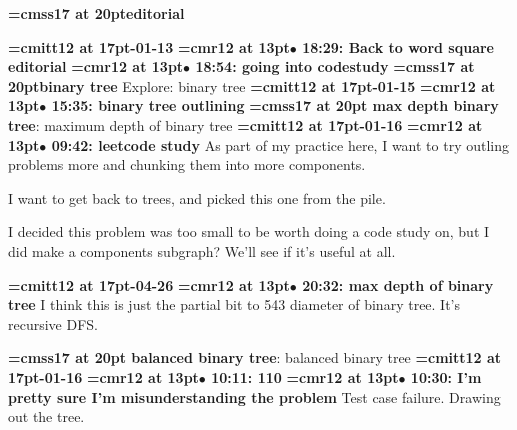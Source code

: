 {\medskip\noindent\bf\font\titlefont=cmss17 at 20pt\titlefont editorial}\medskip

{\medskip\noindent\bf\font\titlefont=cmitt12 at 17pt-01-13}\medskip
{\smallskip\noindent\bf\font\titlefont=cmr12 at 13pt\titlefont $\bullet$ 18:29: Back to word square editorial}\smallskip
{\smallskip\noindent\bf\font\titlefont=cmr12 at 13pt\titlefont $\bullet$ 18:54: going into codestudy}\smallskip
{}
{\medskip\noindent\bf\font\titlefont=cmss17 at 20pt\titlefont binary tree}\medskip
Explore: binary tree
{\medskip\noindent\bf\font\titlefont=cmitt12 at 17pt-01-15}\medskip
{\smallskip\noindent\bf\font\titlefont=cmr12 at 13pt\titlefont $\bullet$ 15:35: binary tree outlining}\smallskip
{}
{\medskip\noindent\bf\font\titlefont=cmss17 at 20pt max depth binary tree}: maximum depth of binary tree
{\medskip\noindent\bf\font\titlefont=cmitt12 at 17pt-01-16}\medskip
{\smallskip\noindent\bf\font\titlefont=cmr12 at 13pt\titlefont $\bullet$ 09:42: leetcode study}\smallskip
As part of my practice here, I want to try outling problems more and chunking them into more components.
\par

I want to get back to trees, and picked this one from the pile.
\par

I decided this problem was too small to be worth doing a code study on, but I did make a components subgraph? We'll see if it's useful at all.
\par

{\medskip\noindent\bf\font\titlefont=cmitt12 at 17pt-04-26}\medskip
{\smallskip\noindent\bf\font\titlefont=cmr12 at 13pt\titlefont $\bullet$ 20:32: max depth of binary tree}\smallskip
I think this is just the partial bit to 543 diameter of binary tree. It's recursive DFS.
\par

{\medskip\noindent\bf\font\titlefont=cmss17 at 20pt balanced binary tree}: balanced binary tree
{\medskip\noindent\bf\font\titlefont=cmitt12 at 17pt-01-16}\medskip
{\smallskip\noindent\bf\font\titlefont=cmr12 at 13pt\titlefont $\bullet$ 10:11: 110}\smallskip
{\smallskip\noindent\bf\font\titlefont=cmr12 at 13pt\titlefont $\bullet$ 10:30: I'm pretty sure I'm misunderstanding the problem}\smallskip
Test case failure. Drawing out the tree.
\par

